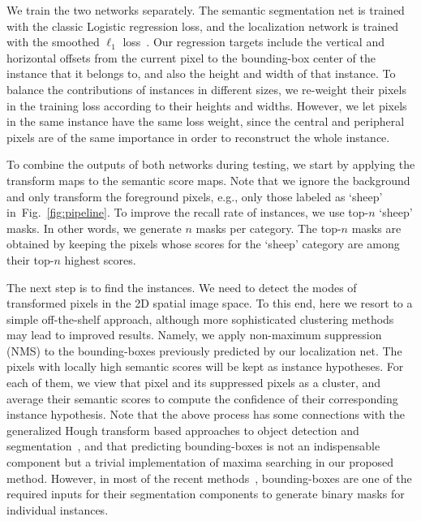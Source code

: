 \documentclass{article}
\begin{document}
We train the two networks separately.
The semantic segmentation net is trained with the classic Logistic regression loss,
and the localization network is trained with the smoothed $\ell_1$ loss~\cite{FastRCNN.ICCV.2015.Girshick}.
Our regression targets include the vertical and horizontal offsets from the current pixel to the bounding-box center of the instance that it belongs to,
and also the height and width of that instance.
To balance the contributions of instances in different sizes,
we re-weight their pixels in the training loss according to their heights and widths.
However, we let pixels in the same instance have the same loss weight,
since the central and peripheral pixels are of the same importance in order to reconstruct the whole instance.



To combine the outputs of both networks during testing, we start by applying the transform maps to the semantic score maps.
Note that we ignore the background and only transform the foreground pixels,
e.g., only those labeled as `sheep' in~Fig.~\ref{fig:pipeline}.
To improve the recall rate of instances, we use top-$n$ `sheep' masks.
In other words, we generate $n$ masks per category.
The top-$n$ masks are  obtained by keeping the pixels whose scores for the `sheep' category are among their top-$n$ highest scores.





The next step is to find the instances.
We need to detect the modes of transformed pixels in the 2D spatial image space.
To this end, here we resort to a simple off-the-shelf approach, although more sophisticated clustering methods
may lead to improved results.
Namely, we apply non-maximum suppression (NMS) to the bounding-boxes previously predicted by our localization net.
The pixels with locally high semantic scores will be kept as instance hypotheses.
For each of them, we view that pixel and its suppressed pixels as a cluster,
and average their semantic scores to compute the confidence of their corresponding instance hypothesis.
Note that the above process has some connections with
the generalized Hough transform based approaches to object detection and segmentation~\cite{ISM.IJCV.2007.Leibe},
and that predicting bounding-boxes is not an indispensable component but a trivial
implementation of maxima searching in our proposed method.
However, in most of the recent methods~\cite{SDS.ECCV.2014.Hariharan,HyperColumn.CVPR.2015.Hariharan,MNC.CVPR.2016.Dai},
bounding-boxes are one of the required inputs for their segmentation components to generate binary masks for individual instances.
\end{document}

